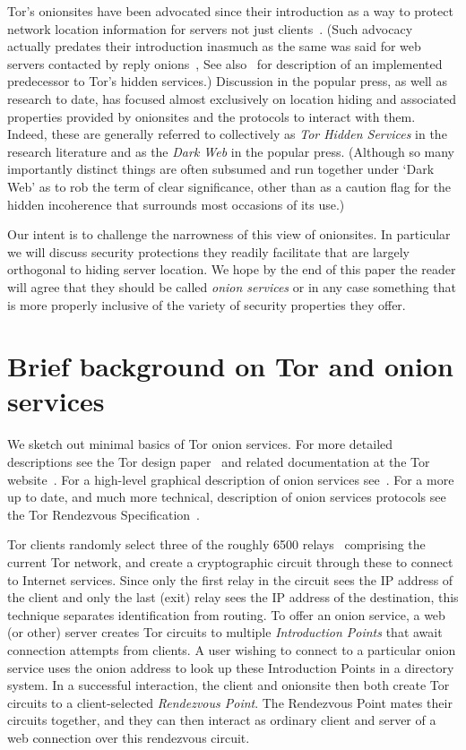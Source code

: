 \documentclass[10pt, conference, compsocconf]{styles/IEEEtran}
\begin{document}
Tor's onionsites have been advocated since their introduction as a
way to protect network location information for servers not just
clients~\cite{tor-design}. (Such advocacy actually predates
  their introduction inasmuch as the same was said for web servers
  contacted by reply onions~\cite{onion-routing:cacm99}, See
  also~\cite{rewebber} for description of an implemented predecessor
  to Tor's hidden services.)  Discussion in the popular press, as well
as research to date, has focused almost exclusively on location hiding
and associated properties provided by onionsites and the protocols
to interact with them. Indeed, these are generally referred to
collectively as \emph{Tor Hidden Services} in the research literature
and as the \emph{Dark Web} in the popular press. (Although so many
importantly distinct things are often subsumed and run together under
`Dark Web' as to rob the term of clear significance, other than as a
caution flag for the hidden incoherence that surrounds
most occasions of its use.)

Our intent is to challenge the narrowness of this view of
onionsites. In particular we will discuss security protections they
readily facilitate that are largely orthogonal to hiding server
location. We hope by the end of this paper the reader will agree that
they should be called \emph{onion services} or in any
case something that is more properly inclusive of the variety of
security properties they offer.

\section{Brief background on Tor and onion services}

We sketch out minimal basics of Tor onion services. For more detailed
descriptions see the Tor design paper~\cite{tor-design} and related documentation at the
Tor website~\cite{torproject}. For a high-level graphical description
of onion services see~\cite{tor-hs}. For a more up to date, and much
more technical, description of onion services protocols see the Tor
Rendezvous Specification~\cite{tor-rend-spec}.

Tor clients randomly select three of the roughly 6500 relays~\cite{tor-network-size}
comprising the current Tor network, and create a cryptographic circuit
through these to connect to Internet services. Since only the first
relay in the circuit sees the IP address of the client and
only the last (exit) relay sees the IP address of the destination,
this technique separates identification from routing.
To offer an onion service, a web (or other) server creates Tor circuits to
multiple \emph{Introduction Points} that await connection attempts
from clients. A user wishing to connect to a particular onion service
uses the onion address to look up these Introduction Points in a
directory system. In a successful interaction, the client and
onionsite then both create Tor circuits to a client-selected
\emph{Rendezvous Point}. The Rendezvous Point mates their circuits
together, and they can then interact as ordinary client and server of
a web connection over this rendezvous circuit.
\end{document}
